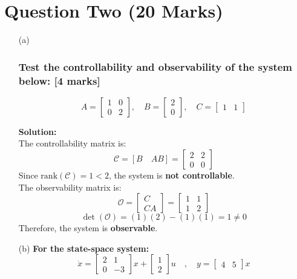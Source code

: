 \documentclass[12pt]{article}
\begin{document}
	
	
	\section*{Question Two \hfill (20 Marks)}
	
	\begin{enumerate}
		\item[(a)] \subsubsection*{Test the controllability and observability of the system below:  [4 marks]} 
		\[
		A = \begin{bmatrix} 1 & 0 \\ 0 & 2 \end{bmatrix}, \quad
		B = \begin{bmatrix} 2 \\ 0 \end{bmatrix}, \quad
		C = \begin{bmatrix} 1 & 1 \end{bmatrix}
		\]
		
		\textbf{Solution:} \\
		The controllability matrix is:
		\[
		\mathcal{C} = [B \quad AB] = \begin{bmatrix} 2 & 2 \\ 0 & 0 \end{bmatrix}
		\]
		Since \(\text{rank}(\mathcal{C}) = 1 < 2\), the system is \textbf{not controllable}. \\
		
		The observability matrix is:
		\[
		\mathcal{O} = \begin{bmatrix} C \\ CA \end{bmatrix} = \begin{bmatrix} 1 & 1 \\ 1 & 2 \end{bmatrix}
		\]
		\[
		\det(\mathcal{O}) = (1)(2) - (1)(1) = 1 \neq 0
		\]
		Therefore, the system is \textbf{observable}.
		
		\item[(b)] \textbf{For the state-space system:}
		\[
		\dot{x} = \begin{bmatrix} 2 & 1 \\ 0 & -3 \end{bmatrix}x + \begin{bmatrix} 1 \\ 2 \end{bmatrix}u
		\quad , \quad
		y = \begin{bmatrix} 4 & 5 \end{bmatrix}x
		\]
		

\end{enumerate}
\end{document}
